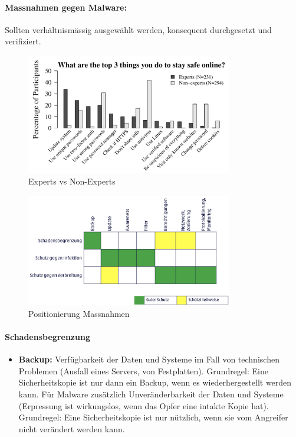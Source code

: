 \documentclass[10pt,a4paper]{article}
\begin{document}
\paragraph*{Massnahmen gegen Malware:} Sollten verhältnismässig ausgewählt werden, konsequent durchgesetzt und verifiziert.
\begin{figure}[H]
    \begin{center}
    \includegraphics[width=9cm]{images/expertvsnonexpert.png}
    \caption{Experts vs Non-Experts}
    \label{expertvsnonexpert}
    \end{center}
\end{figure}
\begin{figure}[H]
    \begin{center}
    \includegraphics[width=9cm]{images/massnahmenpost.png}
    \caption{Positionierung Massnahmen}
    \label{massnahmenpost}
    \end{center}
\end{figure}
\paragraph*{Schadensbegrenzung}
\begin{itemize}[noitemsep,topsep=0pt,leftmargin=*]
	\item \textbf{Backup:} Verfügbarkeit der Daten und Systeme im Fall von technischen Problemen (Ausfall eines Servers, von Festplatten). Grundregel: Eine Sicherheitskopie ist nur dann ein Backup, wenn es wiederhergestellt werden kann. Für Malware zusätzlich Unveränderbarkeit der Daten und Systeme (Erpressung ist wirkungslos, wenn das Opfer eine intakte Kopie hat). Grundregel: Eine Sicherheitskopie ist nur nützlich, wenn sie vom Angreifer nicht verändert werden kann.
\end{itemize}
\end{document}
